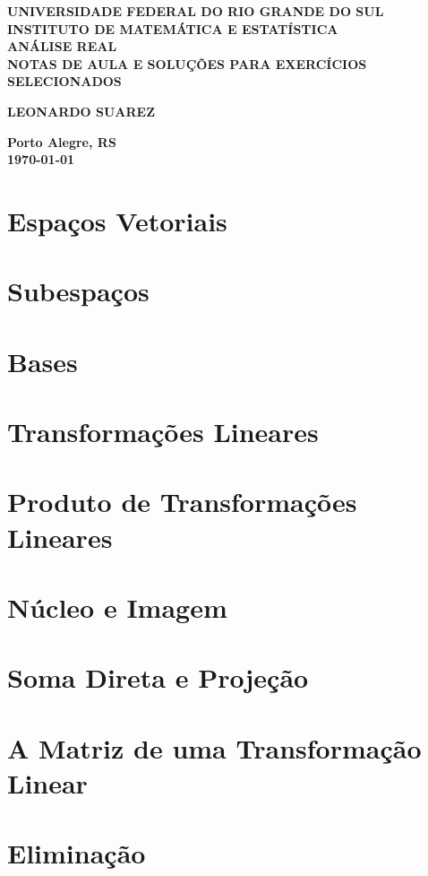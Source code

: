 \documentclass[12pt]{article}
\theoremstyle{plain}
\theoremstyle{definition}
\theoremstyle{remark}
\begin{document}
\begin{center}
    \textbf{\large UNIVERSIDADE FEDERAL DO RIO GRANDE DO SUL} \\
    \textbf{\large INSTITUTO DE MATEMÁTICA E ESTATÍSTICA} \\
    \vspace{3cm}
    \textbf{\Large ANÁLISE REAL} \\
    \vspace{1cm}
    \textbf{\large NOTAS DE AULA E SOLUÇÕES PARA EXERCÍCIOS SELECIONADOS} \\
    \vspace{3cm}

    \textbf{LEONARDO SUAREZ}

    \vfill
    \textbf{\large Porto Alegre, RS} \\
    \textbf{\large \today}
\end{center}

\newpage
\tableofcontents
\newpage

\section{Espaços Vetoriais}
\section{Subespaços}
\section{Bases}
\section{Transformações Lineares}
\section{Produto de Transformações Lineares}
\section{Núcleo e Imagem}
\section{Soma Direta e Projeção}
\section{A Matriz de uma Transformação Linear}
\section{Eliminação}
\end{document}
